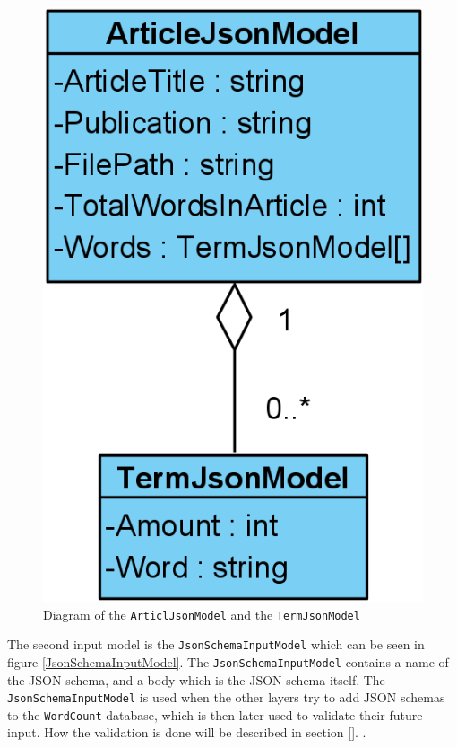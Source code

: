 \begin{figure}[H]
    \centering
    \includegraphics[scale=0.5]{Images/jsonArticleModel.PNG}
    \caption{Diagram of the \texttt{ArticlJsonModel} and the \texttt{TermJsonModel}}
    \label{ArticlJsonModel}
\end{figure}

The second input model is the \texttt{JsonSchemaInputModel} which can be seen in figure \ref*{JsonSchemaInputModel}. The \texttt{JsonSchemaInputModel} contains a name of the JSON schema, and a body which is the JSON schema itself. 
The \texttt{JsonSchemaInputModel} is used when the other layers try to add JSON schemas to the \texttt{WordCount} database, which is then later used to validate their future input. 
How the validation is done will be described in section \ref*{}. .

